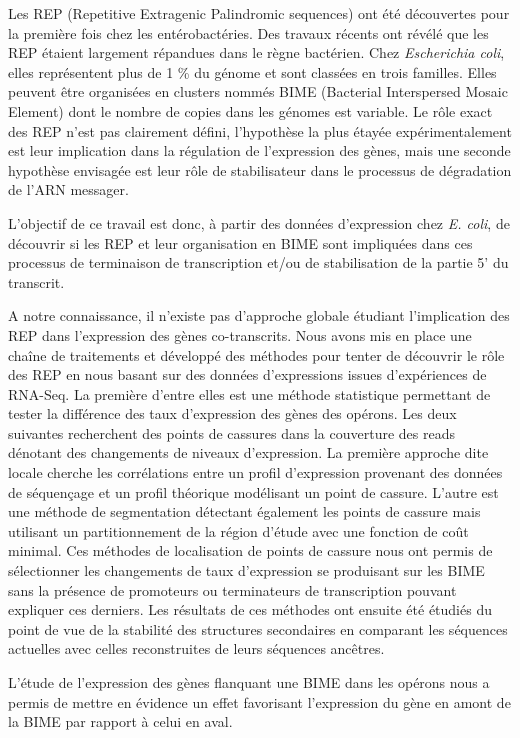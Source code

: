\documentclass[12pt,a4paper]{report}
\begin{document}
Les REP (Repetitive Extragenic Palindromic sequences) ont été découvertes pour la première fois chez les entérobactéries. Des travaux récents ont révélé que les REP étaient largement répandues dans le règne bactérien. Chez \textit{Escherichia coli}, elles représentent plus de 1 \% du génome et sont classées en trois familles. Elles peuvent être organisées en clusters nommés BIME (Bacterial Interspersed Mosaic Element) dont le nombre de copies dans les génomes est variable. Le rôle exact des REP n’est pas clairement défini, l'hypothèse la plus étayée expérimentalement est leur implication dans la régulation de l’expression des gènes, mais une seconde hypothèse envisagée est leur rôle de stabilisateur dans le processus de dégradation de l'ARN messager.

L'objectif de ce travail est donc, à partir des données d'expression chez \textit{E. coli}, de découvrir si les REP et leur organisation en BIME sont impliquées dans ces processus de terminaison de transcription et/ou de stabilisation de la partie 5' du transcrit.

A notre connaissance, il n'existe pas d'approche globale étudiant l'implication des REP dans l'expression des gènes co-transcrits. Nous avons mis en place une chaîne de traitements et développé des méthodes pour tenter de découvrir le rôle des REP en nous basant sur des données d'expressions issues d'expériences de RNA-Seq. La première d'entre elles est une méthode statistique permettant de tester la différence des taux d'expression des gènes des opérons. Les deux suivantes recherchent des points de cassures dans la couverture des reads dénotant des changements de niveaux d'expression. La première approche dite locale cherche les corrélations entre un profil d'expression provenant des données de séquençage et un profil théorique modélisant un point de cassure. L'autre est une méthode de segmentation détectant également les points de cassure mais utilisant un partitionnement de la région d'étude avec une fonction de coût minimal. Ces méthodes de localisation de points de cassure nous ont permis de sélectionner les changements de taux d'expression se produisant sur les BIME sans la présence de promoteurs ou terminateurs de transcription pouvant expliquer ces derniers. Les résultats de ces méthodes ont ensuite été étudiés du point de vue de la stabilité des structures secondaires en comparant les séquences actuelles avec celles reconstruites de leurs séquences ancêtres.

L'étude de l'expression des gènes flanquant une BIME dans les opérons nous a permis de mettre en évidence un effet favorisant l'expression du gène en amont de la BIME par rapport à celui en aval. 
\end{document}
